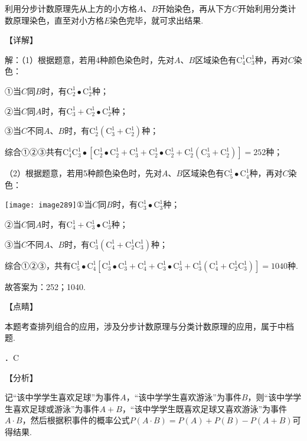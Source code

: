 \noindent 利用分步计数原理先从上方的小方格$A$、$B$开始染色，再从下方$C$开始利用分类计数原理染色，直至对小方格$E$染色完毕，就可求出结果.

\noindent 【详解】

\noindent 解：（1）根据题意，若用4种颜色染色时，先对$A$、$B$区域染色有$\mathrm C_{4}^{1} \mathrm C_{3}^{1} $种，再对$C$染色：

\noindent ①当$C$同$B$时，有$\mathrm C_{2}^{1} \bullet \mathrm C_{2}^{1} $种；

\noindent ②当$C$同$A$时，有$\mathrm C_{3}^{1} +\mathrm C_{2}^{1} \bullet \mathrm C_{2}^{1} $种；

\noindent ③当$C$不同$A$、$B$时，有$\mathrm C_{2}^{1} (\mathrm C_{3}^{1} +\mathrm C_{2}^{1} )$种；

\noindent 综合①②③共有$\mathrm C_{4}^{1} \mathrm C_{3}^{1} \bullet [\mathrm C_{2}^{1} \bullet \mathrm C_{2}^{1} +\mathrm C_{3}^{1} +\mathrm C_{2}^{1} \bullet \mathrm C_{2}^{1} +\mathrm C_{2}^{1} (\mathrm C_{3}^{1} +\mathrm C_{2}^{1} )]=252$种；

\noindent （2）根据题意，若用5种颜色染色时，先对$A$、$B$区域染色有$\mathrm C_{5}^{1} \bullet \mathrm C_{4}^{1} $种，再对$C$染色：

\noindent \texttt{[image: image289]}①当$C$同$B$时，有$\mathrm C_{3}^{1} \bullet \mathrm C_{3}^{1} $种；

\noindent ②当$C$同$A$时，有$\mathrm C_{4}^{1} +\mathrm C_{3}^{1} \bullet \mathrm C_{3}^{1} $种；

\noindent ③当$C$不同$A$、$B$时，有$\mathrm C_{3}^{1} (\mathrm C_{4}^{1} +\mathrm C_{2}^{1} \mathrm C_{3}^{1} )$种；

\noindent 综合①②③，共有$\mathrm C_{5}^{1} \bullet \mathrm C_{4}^{1} [\mathrm C_{3}^{1} \bullet \mathrm C_{3}^{1} +\mathrm C_{4}^{1} +\mathrm C_{3}^{1} \bullet \mathrm C_{3}^{1} +\mathrm C_{3}^{1} (\mathrm C_{4}^{1} +\mathrm C_{2}^{1} \mathrm C_{3}^{1} )]=1040$种.

\noindent 故答案为：252；1040.

\noindent 【点睛】

\noindent 本题考查排列组合的应用，涉及分步计数原理与分类计数原理的应用，属于中档题.

．C

\noindent 【分析】

\noindent 记``该中学学生喜欢足球''为事件$A$，``该中学学生喜欢游泳''为事件$B$，则``该中学学生喜欢足球或游泳''为事件$A+B$，``该中学学生既喜欢足球又喜欢游泳''为事件$A\cdot B$，然后根据积事件的概率公式$P(A\cdot B)=$$P(A)+P(B)-P(A+B)$可得结果.

